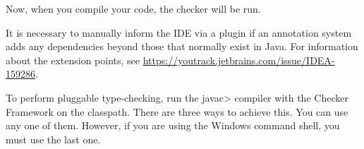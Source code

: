 Now, when you compile your code, the checker will be run.

It is necessary to manually inform the IDE via a plugin if an annotation
system adds any dependencies beyond those that normally exist in Java.
For information about the extension points, see
\url{https://youtrack.jetbrains.com/issue/IDEA-159286}.



To perform pluggable type-checking, run the \<javac> compiler with the
Checker Framework on the classpath.
There are three ways to achieve this.  You can use any
one of them.  However, if you are using the Windows command shell, you must
use the last one.


